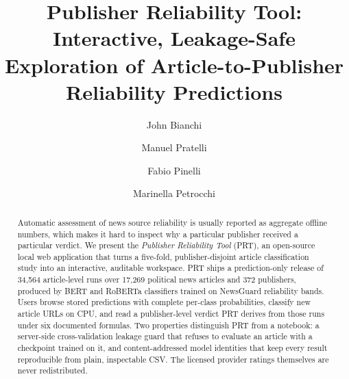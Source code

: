 \documentclass[runningheads]{llncs}
\begin{document}
\title{Publisher Reliability Tool: Interactive, Leakage-Safe\\
       Exploration of Article-to-Publisher Reliability Predictions}

\author{%
John Bianchi \and
Manuel Pratelli \and
Fabio Pinelli \and
Marinella Petrocchi}


\maketitle

\begin{abstract}
Automatic assessment of news source reliability is usually reported as
aggregate offline numbers, which makes it hard to inspect why a particular
publisher received a particular verdict. We present the \emph{Publisher
Reliability Tool} (PRT), an open-source local web application that turns a
five-fold, publisher-disjoint article classification study into an interactive,
auditable workspace. PRT ships a prediction-only release of 34,564
article-level runs over 17,269 political news articles and 372 publishers,
produced by BERT and RoBERTa classifiers trained on NewsGuard reliability
bands. Users browse stored predictions with complete per-class probabilities,
classify new article URLs on CPU, and read a publisher-level verdict PRT derives
from those runs under six documented formulas. Two properties
distinguish PRT from a notebook: a server-side cross-validation leakage guard
that refuses to evaluate an article with a checkpoint trained on it, and
content-addressed model identities that keep every result reproducible from
plain, inspectable CSV. The licensed provider ratings themselves are never
redistributed.
\end{abstract}
\end{document}
